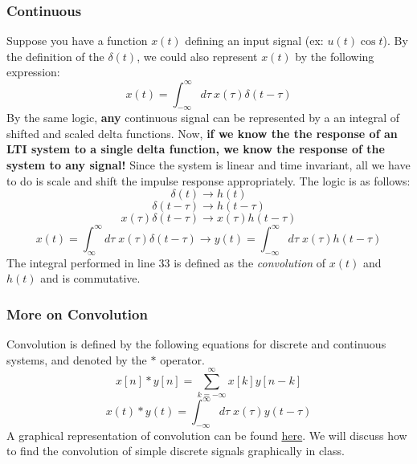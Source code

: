 \documentclass[a4paper]{article}
\numberwithin{equation}{section}
\begin{document}
\subsubsection{Continuous}
Suppose you have a function $x(t)$ defining an input signal (ex: $u(t)\cos{t}$). By the definition of the $\delta(t)$, we could also represent $x(t)$ by the following expression:
\begin{equation}
x(t)=\int_{-\infty}^{\infty}d\tau\: x(\tau)\delta(t-\tau)
\end{equation}
By the same logic, \textbf{any} continuous signal can be represented by a an integral of shifted and scaled delta functions. Now, \textbf{if we know the the response of an LTI system to a single delta function, we know the response of the system to any signal!} Since the system is linear and time invariant, all we have to do is scale and shift the impulse response appropriately. The logic is as follows:
\begin{equation}
\delta(t) \rightarrow h(t)
\end{equation}
\begin{equation}
\delta(t-\tau) \rightarrow h(t-\tau)
\end{equation}
\begin{equation}
x(\tau)\delta(t-\tau) \rightarrow x(\tau)h(t-\tau)
\end{equation}
\begin{equation}
x(t)=\int_{\infty}^{\infty}d\tau \; x(\tau)\delta(t-\tau) \rightarrow y(t)=\int_{-\infty}^{\infty}d\tau \; x(\tau)h(t-\tau)
\end{equation}
The integral performed in line 33 is defined as the \textit{convolution} of $x(t)$ and $h(t)$ and is commutative. 

\subsubsection{More on Convolution}
Convolution is defined by the following equations for discrete and continuous systems, and denoted by the $*$ operator.
\begin{equation}
x[n]*y[n]=\sum_{k=-\infty}^{\infty}x[k]y[n-k]
\end{equation}
\begin{equation}
x(t)*y(t)=\int_{-\infty}^{\infty}d\tau \; x(\tau)y(t-\tau)
\end{equation}
A graphical representation of convolution can be found \href{https://upload.wikimedia.org/wikipedia/commons/b/b9/Convolution_of_spiky_function_with_box2.gif}{here}.  We will discuss how to find the convolution of simple discrete signals graphically in class.
\end{document}
